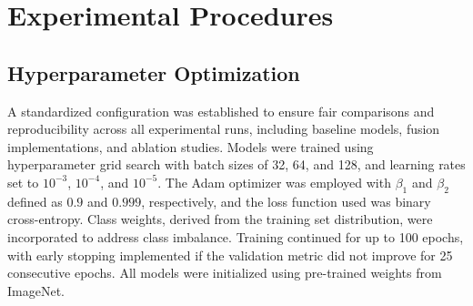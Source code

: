 



\section{Experimental Procedures}
\subsection{Hyperparameter Optimization}

A standardized configuration was established to ensure fair comparisons and reproducibility across all experimental runs, including baseline models, fusion implementations, and ablation studies. Models were trained using hyperparameter grid search with batch sizes of 32, 64, and 128, and learning rates set to $10^{-3}$, $10^{-4}$, and $10^{-5}$.
The Adam optimizer was employed with $\beta_1$ and $\beta_2$ defined as $0.9$ and $0.999$, respectively, and the loss function used was binary cross-entropy. Class weights, derived from the training set distribution, were incorporated to address class imbalance.
Training continued for up to 100 epochs, with early stopping implemented if the validation metric did not improve for 25 consecutive epochs. All models were initialized using pre-trained weights from ImageNet.

